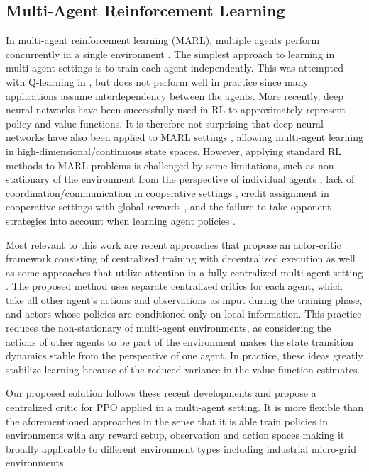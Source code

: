 \subsection{Multi-Agent Reinforcement Learning}
In multi-agent reinforcement learning (MARL), multiple agents perform concurrently in a single environment \cite{Littman1994multiagent, Hu1998MultiagentRL, Busoniu4445757, Tan93multiagentreinforcement}.  The simplest approach to learning in multi-agent settings is to train each agent independently. This was attempted with Q-learning in \cite{Tan93multiagentreinforcement}, but does not perform well in practice \cite{Matignon2012IndependentRL} since many applications assume interdependency between the agents. More recently, deep neural networks have been successfully used in RL to approximately represent policy and value functions. It is therefore not surprising that deep neural networks have also been applied to MARL settings \cite{tampuu2015multiagent, Gupta71682}, allowing multi-agent learning in high-dimensional/continuous state spaces. However, applying standard RL methods to MARL problems is  challenged by some limitations, such as non-stationary of the environment from the perspective of individual agents \cite{foerster2017stabilising, Lowe2017MultiAgentAF, Foerster2017CounterfactualMP}, lack of coordination/communication in cooperative settings \cite{Lowe2017MultiAgentAF, NIPS2016_6398, MordatchA17, FoersterAFW16a}, credit assignment in cooperative settings with global rewards \cite{Foerster2017CounterfactualMP, Rashid2018,Sunehag3238080}, and the failure to take opponent strategies into account when learning agent policies \cite{He3045581}.

Most relevant to this work are recent approaches \cite{MordatchA17, Foerster2017CounterfactualMP} that propose an actor-critic framework consisting of centralized training with decentralized execution as well as some approaches that utilize attention in a fully centralized multi-agent setting \cite{Choi2017MultifocusAN, Jiang3327828}. The proposed method uses separate centralized critics for each agent, which take all other agent’s actions and observations as input during the training phase, and  actors whose policies are conditioned only on local information. This practice reduces the non-stationary of multi-agent environments, as considering the actions of other agents to be part of the environment makes the state transition dynamics stable from the perspective of one agent. In practice, these ideas greatly stabilize learning because of the reduced variance in the value function estimates.

Our proposed solution follows these recent developments and propose a centralized critic for PPO applied in a multi-agent setting. It is more flexible than the aforementioned approaches in the sense that it is able train policies in environments with any reward setup, observation and action spaces making it broadly applicable to different environment types including industrial micro-grid environments.


